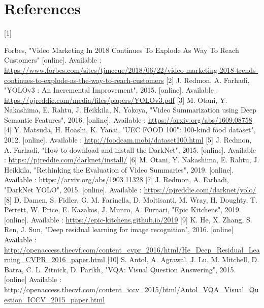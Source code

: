 \documentclass{article}
\begin{document}
\newpage

\section{References}
\hypertarget{ref1}{[1]} Forbes, "Video Marketing In 2018 Continues To Explode As Way To Reach Customers" [online]. Available :  \href{https://www.forbes.com/sites/tjmccue/2018/06/22/video-marketing-2018-trends-continues-to-explode-as-the-way-to-reach-customers}{https://www.forbes.com/sites/tjmccue/2018/06/22/video-marketing-2018-trends-continues-to-explode-as-the-way-to-reach-customers}
\newline
\hypertarget{ref2}{[2]} J. Redmon, A. Farhadi, "YOLOv3 : An Incremental Improvement", 2015. [online]. Available :  \url{https://pjreddie.com/media/files/papers/YOLOv3.pdf}
\newline
\hypertarget{ref3}{[3]} M. Otani, Y. Nakashima, E. Rahtu, J. Heikkila, N. Yokoya, "Video Summarization using Deep Semantic Features", 2016. [online]. Available : \url{https://arxiv.org/abs/1609.08758}
\newline
\hypertarget{ref4}{[4]} Y. Matsuda, H. Hoashi, K. Yanai, "UEC FOOD 100": 100-kind food dataset", 2012. [online]. Available : \url{http://foodcam.mobi/dataset100.html}
\newline
\hypertarget{ref5}{[5]} J. Redmon, A. Farhadi, "How to download and install the DarkNet", 2015. [online]. Available :  \url{https://pjreddie.com/darknet/install/}
\newline
\hypertarget{ref6}{[6]} M. Otani, Y. Nakashima, E. Rahtu, J. Heikkila, "Rethinking the Evaluation of Video Summaries", 2019. [online]. Available :  \url{https://arxiv.org/abs/1903.11328}
\newline
\hypertarget{ref7}{[7]}  J. Redmon, A. Farhadi, "DarkNet YOLO", 2015. [online]. Available :  \url{https://pjreddie.com/darknet/yolo/}
\newline
\hypertarget{ref8}{[8]}  D. Damen, S. Fidler, G. M. Farinella, D. Moltisanti, M. Wray, H. Doughty, T. Perrett, W. Price, E. Kazakos, J. Munro, A. Furnari, "Epic Kitchens", 2019. [online]. Available :  \url{https://epic-kitchens.github.io/2019}
\newline
\hypertarget{ref9}{[9]}  K. He, X. Zhang, S. Ren, J. Sun, "Deep residual learning for image recognition", 2016. [online] Available : \url{http://openaccess.thecvf.com/content_cvpr_2016/html/He_Deep_Residual_Learning_CVPR_2016_paper.html}
\newline
\hypertarget{ref10}{[10]}  S. Antol, A. Agrawal, J. Lu, M. Mitchell, D. Batra, C. L. Zitnick, D. Parikh, "VQA: Visual Question Answering", 2015. [online] Available : \url{http://openaccess.thecvf.com/content_iccv_2015/html/Antol_VQA_Visual_Question_ICCV_2015_paper.html}
\end{document}
